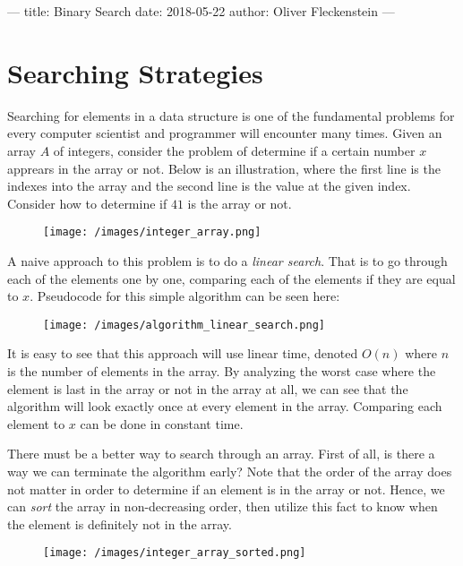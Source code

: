 ---
title: Binary Search
date: 2018-05-22
author: Oliver Fleckenstein
---
\section{Searching Strategies}

    Searching for elements in a data structure is one of the fundamental problems for every computer scientist and programmer will encounter many times.
    Given an array $A$ of integers, consider the problem of determine if a certain number $x$ apprears in the array or not.
    Below is an illustration, where the first line is the indexes into the array and the second line is the value at the given index.
    Consider how to determine if $41$ is the array or not.

    \begin{figure}[!h]
        \centering
        \texttt{[image: /images/integer\_array.png]}
    \end{figure}

    A naive approach to this problem is to do a \emph{linear search}.
    That is to go through each of the elements one by one, comparing each of the elements if they are equal to $x$.
    Pseudocode for this simple algorithm can be seen here:

    \begin{figure}[!h]
        \centering
        \texttt{[image: /images/algorithm\_linear\_search.png]}
    \end{figure}

    It is easy to see that this approach will use linear time, denoted $O(n)$ where $n$ is the number of elements in the array.
    By analyzing the worst case where the element is last in the array or not in the array at all, we can see that the algorithm will look exactly once at every element in the array.
    Comparing each element to $x$ can be done in constant time.

    There must be a better way to search through an array.
    First of all, is there a way we can terminate the algorithm early?
    Note that the order of the array does not matter in order to determine if an element is in the array or not.
    Hence, we can \emph{sort} the array in non-decreasing order, then utilize this fact to know when the element is definitely not in the array.

    \begin{figure}[!h]
        \centering
        \texttt{[image: /images/integer\_array\_sorted.png]}
    \end{figure}

